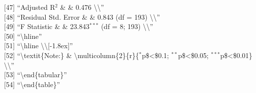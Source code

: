 \documentclass[
]{article}
\begin{document}
{[}47{]} ``Adjusted R\(^{2}\) \& \& 0.476
\textbackslash\textbackslash{}''\\
{[}48{]} ``Residual Std. Error \& \& 0.843 (df = 193)
\textbackslash\textbackslash{}''\\
{[}49{]} ``F Statistic \& \& 23.843\(^{***}\) (df = 8; 193)
\textbackslash\textbackslash{}''\\
{[}50{]} ``\textbackslash hline''\\
{[}51{]} ``\textbackslash hline
\textbackslash\textbackslash{[}-1.8ex{]}''\\
{[}52{]} ``\textbackslash textit\{Note:\} \&
\textbackslash multicolumn\{2\}\{r\}\{\(^{*}\)p\$\textless\$0.1;
\(^{**}\)p\$\textless\$0.05; \(^{***}\)p\$\textless\$0.01\}
\textbackslash\textbackslash{}''\\
{[}53{]} ``\textbackslash end\{tabular\}''\\
{[}54{]} ``\textbackslash end\{table\}''
\end{document}
